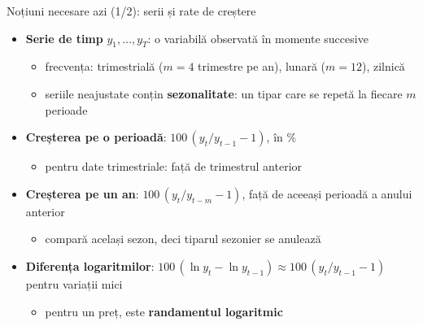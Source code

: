 \begin{frame}{Noțiuni necesare azi (1/2): serii și rate de creștere}
\itemsize{\small}
\begin{itemize}
    \item \textbf{Serie de timp} $y_1, \ldots, y_T$: o variabilă observată în momente succesive
    \begin{itemize}
        \item frecvența: trimestrială ($m = 4$ trimestre pe an), lunară ($m = 12$), zilnică
        \item seriile neajustate conțin \textbf{sezonalitate}: un tipar care se repetă la fiecare $m$ perioade
    \end{itemize}
    \item \textbf{Creșterea pe o perioadă}: $100\,(y_t / y_{t-1} - 1)$, în \%
    \begin{itemize}
        \item pentru date trimestriale: față de trimestrul anterior
    \end{itemize}
    \item \textbf{Creșterea pe un an}: $100\,(y_t / y_{t-m} - 1)$, față de aceeași perioadă a anului anterior
    \begin{itemize}
        \item compară același sezon, deci tiparul sezonier se anulează
    \end{itemize}
    \item \textbf{Diferența logaritmilor}: $100\,(\ln y_t - \ln y_{t-1}) \approx 100\,(y_t / y_{t-1} - 1)$ pentru variații mici
    \begin{itemize}
        \item pentru un preț, este \textbf{randamentul logaritmic}
    \end{itemize}
\end{itemize}
\end{frame}

